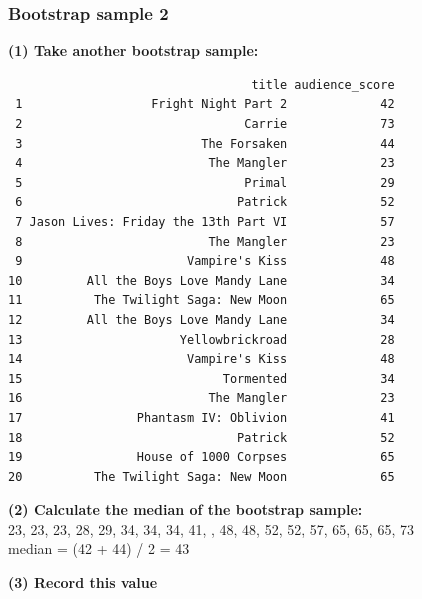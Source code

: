 \documentclass[11pt,containsverbatim,handout,xcolor=xelatex,dvipsnames,table]{beamer}
\begin{document}
\begin{frame}[fragile]
\frametitle{Bootstrap sample 2}

{\small \textbf{(1) Take another bootstrap sample:}}
\pause
{\tiny
\begin{verbatim}
                                  title audience_score
 1                  Fright Night Part 2             42
 2                               Carrie             73
 3                         The Forsaken             44
 4                          The Mangler             23
 5                               Primal             29
 6                              Patrick             52
 7 Jason Lives: Friday the 13th Part VI             57
 8                          The Mangler             23
 9                       Vampire's Kiss             48
10         All the Boys Love Mandy Lane             34
11          The Twilight Saga: New Moon             65
12         All the Boys Love Mandy Lane             34
13                      Yellowbrickroad             28
14                       Vampire's Kiss             48
15                            Tormented             34
16                          The Mangler             23
17                Phantasm IV: Oblivion             41
18                              Patrick             52
19                House of 1000 Corpses             65
20          The Twilight Saga: New Moon             65
\end{verbatim}
}

\pause

{\small \textbf{(2) Calculate the median of the bootstrap sample:}} \\
\pause
{\footnotesize
23, 23, 23, 28, 29, 34, 34, 34, 41, , 48, 48, 52, 52, 57, 65, 65, 65, 73 \\
median = (42 + 44) / 2 = 43 \\
}

\pause

{\small
\textbf{(3) Record this value}
}

\end{frame}

\end{document}
